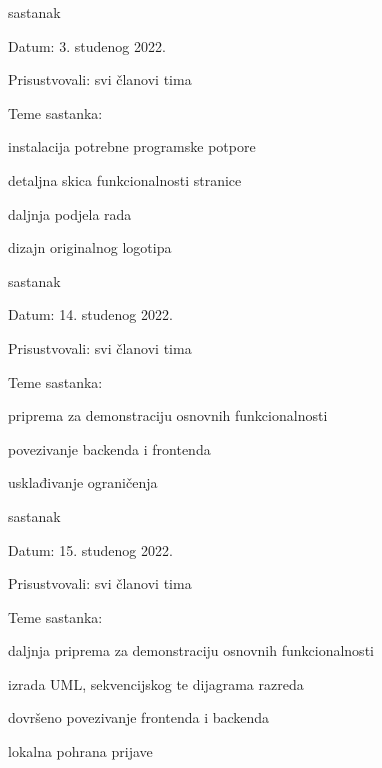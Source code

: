 \begin{packed_enum}
			\item  sastanak
			\item[] \begin{packed_item}
				\item Datum: 3. studenog 2022.
				\item Prisustvovali: svi članovi tima
				\item Teme sastanka:
				\begin{packed_item}
					\item  instalacija potrebne programske potpore
					\item  detaljna skica funkcionalnosti stranice
					\item  daljnja podjela rada
					\item  dizajn originalnog logotipa
				\end{packed_item}
			\end{packed_item}
		
			\item  sastanak
			\item[] \begin{packed_item}
				\item Datum: 14. studenog 2022.
				\item Prisustvovali: svi članovi tima
				\item Teme sastanka:
				\begin{packed_item}
					\item  priprema za demonstraciju osnovnih funkcionalnosti
					\item  povezivanje backenda i frontenda
					\item  usklađivanje ograničenja
				\end{packed_item}
			\end{packed_item}
		
			\item  sastanak
			\item[] \begin{packed_item}
				\item Datum: 15. studenog 2022.
				\item Prisustvovali: svi članovi tima
				\item Teme sastanka:
				\begin{packed_item}
					\item  daljnja priprema za demonstraciju osnovnih funkcionalnosti
					\item  izrada UML, sekvencijskog te dijagrama razreda
					\item  dovršeno povezivanje frontenda i backenda
					\item  lokalna pohrana prijave
				\end{packed_item}
			\end{packed_item}
		

\end{packed_enum}
